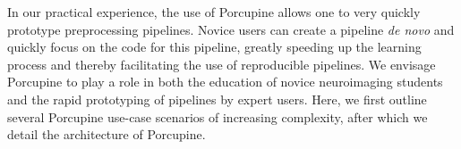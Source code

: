 In our practical experience, the use of Porcupine allows one to very quickly prototype preprocessing pipelines. Novice users can create a pipeline \emph{de novo} and quickly focus on the code for this pipeline, greatly speeding up the learning process and thereby facilitating the use of reproducible pipelines. We envisage Porcupine to play a role in both the education of novice neuroimaging students and the rapid prototyping of pipelines by expert users. Here, we first outline several Porcupine use-case scenarios of increasing complexity, after which we detail the architecture of Porcupine.


